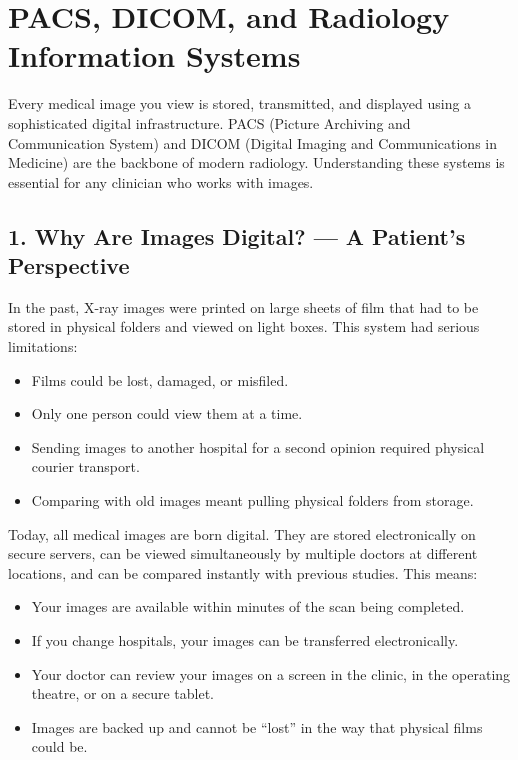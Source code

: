 \chapter{PACS, DICOM, and Radiology Information Systems}

\label{ch:ch09_pacs_dicom}

Every medical image you view is stored, transmitted, and displayed using a sophisticated digital infrastructure. PACS (Picture Archiving and Communication System) and DICOM (Digital Imaging and Communications in Medicine) are the backbone of modern radiology. Understanding these systems is essential for any clinician who works with images.


\section*{1. Why Are Images Digital? --- A Patient's Perspective}
In the past, X-ray images were printed on large sheets of film that had to be stored in physical folders and viewed on light boxes. This system had serious limitations:
\begin{itemize}
    \item Films could be lost, damaged, or misfiled.
    \item Only one person could view them at a time.
    \item Sending images to another hospital for a second opinion required physical courier transport.
    \item Comparing with old images meant pulling physical folders from storage.
\end{itemize}

Today, all medical images are born digital. They are stored electronically on secure servers, can be viewed simultaneously by multiple doctors at different locations, and can be compared instantly with previous studies. This means:
\begin{itemize}
    \item Your images are available within minutes of the scan being completed.
    \item If you change hospitals, your images can be transferred electronically.
    \item Your doctor can review your images on a screen in the clinic, in the operating theatre, or on a secure tablet.
    \item Images are backed up and cannot be ``lost'' in the way that physical films could be.
\end{itemize}


